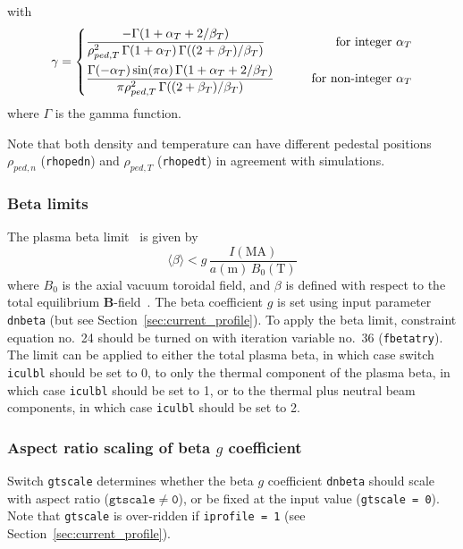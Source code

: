 \documentclass[11pt,a4paper]{report}
\begin{document}
with 
\begin{equation}
\gamma = \left\{ 
\begin{aligned}
  &\frac{ -\Gamma(1+\alpha_T+2/\beta_T)}
  {\rho_{ped,T}^2 \, \Gamma(1+\alpha_T) \, \Gamma((2+\beta_T)/\beta_T)}
  &\qquad \textnormal{for integer } \alpha_T \\
  &\frac{\Gamma(-\alpha_T)\sin(\pi\alpha)\, \Gamma(1+\alpha_T+2/\beta_T)}
  {\pi\rho_{ped,T}^2 \, \Gamma((2+\beta_T)/\beta_T)}
  &\qquad \textnormal{for non-integer } \alpha_T
\end{aligned}
\right.
\end{equation}
where $\Gamma$ is the gamma function.

Note that both density and temperature can have different pedestal positions
$\rho_{ped,n}$ (\texttt{rhopedn}) and $\rho_{ped,T}$ (\texttt{rhopedt}) in
agreement with simulations.

\subsubsection{Beta limits}

The plasma beta limit~\cite{IPDG,172} is given by
\begin{equation}
\langle \beta \rangle < g \, \frac{I(\mbox{MA})}{a(\mbox{m}) \, B_0(\mbox{T})}
\label{eq:troyon}
\end{equation}
where $B_0$ is the axial vacuum toroidal field, and $\beta$ is defined with
respect to the total equilibrium $\mathbf{B}$-field~\cite{172}. The beta
coefficient $g$ is set using input parameter \texttt{dnbeta} (but see
Section~\ref{sec:current_profile}). To apply the beta limit, constraint
equation no.\ 24 should be turned on with iteration variable no.\ 36
(\texttt{fbetatry}). The limit can be applied to either the total plasma beta,
in which case switch \texttt{iculbl} should be set to 0, to only the thermal
component of the plasma beta, in which case \texttt{iculbl} should be set to
1, or to the thermal plus neutral beam components, in which case
\texttt{iculbl} should be set to 2.

\subsubsection*{Aspect ratio scaling of beta $g$ coefficient}

Switch \texttt{gtscale} determines whether the beta $g$ coefficient
\texttt{dnbeta} should scale with aspect ratio ($\mathtt{gtscale \not= 0}$),
or be fixed at the input value (\texttt{gtscale = 0}). Note that
\texttt{gtscale} is over-ridden if \texttt{iprofile = 1} (see
Section~\ref{sec:current_profile}).
\end{document}
